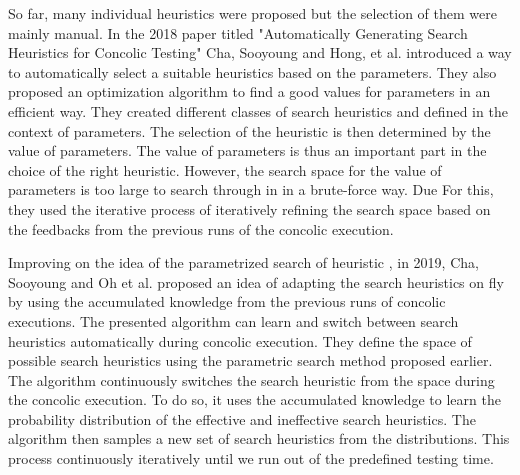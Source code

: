 \documentclass[	runningheads,
				a4paper]{llncs}
\begin{document}
So far, many individual heuristics were proposed but the selection of them were mainly manual. In the 2018 paper titled "Automatically Generating Search Heuristics for Concolic Testing" \cite{cha2018automatically} Cha, Sooyoung and Hong, et al. introduced a way to automatically select a suitable heuristics based on the parameters. They also proposed an optimization algorithm to find a good values for parameters in an efficient way. They created different classes of search heuristics and defined in the context of parameters. The selection of the heuristic is then determined by the value of parameters. The value of parameters is thus an important part in the choice of the right heuristic. However, the search space for the value of parameters is too large to search through in in a brute-force way. Due For this, they used the iterative process of iteratively refining the search space based on the feedbacks from the previous runs of the concolic execution. 

Improving on the idea of the parametrized search of heuristic \cite{cha2018automatically}, in 2019, Cha, Sooyoung and Oh et al. proposed an idea \cite{adapt2019heuristic} of adapting the search heuristics on fly by using the accumulated knowledge from the previous runs of concolic executions. The presented algorithm can learn and switch between search heuristics automatically during concolic execution. They define the space of possible search heuristics using the parametric search method \cite{adapt2019heuristic} proposed earlier. The algorithm continuously switches the search heuristic from the space during the concolic execution. To do so, it uses the accumulated knowledge to learn the probability distribution of the effective and ineffective search heuristics. The algorithm then samples a new set of search heuristics from the distributions. This process continuously iteratively until we run out of the predefined testing time.
\end{document}
